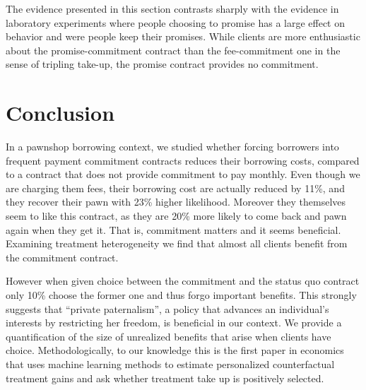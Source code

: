 \documentclass[11pt]{article}
\begin{document}
\vspace{.2in}
The evidence presented in this section contrasts sharply with the evidence in laboratory experiments where people choosing to promise has a large effect on behavior and were people keep their promises. While clients are more enthusiastic about the promise-commitment contract than the fee-commitment one in the sense of tripling take-up, the promise contract provides no commitment. 
   
   


    
\section{Conclusion} \label{conclusion}

In a pawnshop borrowing context, we studied whether forcing borrowers into frequent payment commitment contracts reduces their borrowing costs, compared to a contract that does not provide commitment to pay monthly. Even though we are charging them fees, their borrowing cost are actually reduced by 11\%, and they recover their pawn with 23\% higher likelihood. Moreover they themselves seem to like this contract, as they are 20\% more likely to come back and pawn again when they get it. That is, commitment matters and it seems beneficial. Examining treatment heterogeneity we find that almost all clients benefit from the commitment contract. 

However when given choice between the commitment and the status quo contract only 10\% choose the former one and thus forgo important benefits. This strongly suggests that ``private paternalism'', a policy that advances an individual's interests by restricting her freedom, is beneficial in our context. We provide a quantification of the size of unrealized benefits that arise when clients have choice. Methodologically, to our knowledge this is the first paper in economics that uses machine learning methods to estimate personalized counterfactual treatment gains and ask whether treatment take up is positively selected.
\end{document}

